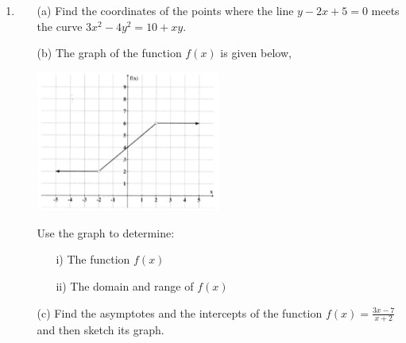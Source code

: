 \begin{enumerate}
	\item
	\begin{enumerate}[topsep=0ex,itemsep=0ex,partopsep=1ex,parsep=1ex]
		\item[(a)] Find the coordinates of the points where the line $y - 2x +5 = 0$ meets the curve $3x^2 - 4y^2 = 10 + xy$.
		
		\item[(b)] The graph of the function $f(x)$ is given below, \\
		\begin{center}
			\includegraphics[width=0.5\textwidth]{./img/math_BAM_functions_1.png}
		\end{center}
		Use the graph to determine:
		\begin{enumerate}[topsep=0ex,itemsep=0ex,partopsep=1ex,parsep=1ex]
			\item[i)] The function $f(x)$
			\item[ii)] The domain and range of $f(x)$
		\end{enumerate}
		
		\item[(c)] Find the asymptotes and the intercepts of the function $f(x) = \frac{3x - 7}{x + 2}$ and then sketch its graph. 
	\end{enumerate}

\end{enumerate}











